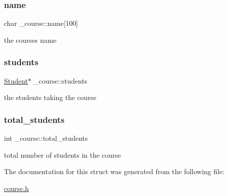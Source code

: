 \subsubsection{\texorpdfstring{name}{name}}
{\footnotesize\ttfamily char \+\_\+course\+::name\mbox{[}100\mbox{]}}

the course\textquotesingle{}s name \mbox{\label{struct__course_a5cf448bc80f0f8c5f23402db23d41a00}} 
\subsubsection{\texorpdfstring{students}{students}}
{\footnotesize\ttfamily \mbox{\hyperlink{student_8h_abcfb362c0eb3182c835992cf3d0c0dd3}{Student}}$\ast$ \+\_\+course\+::students}

the student\textquotesingle{}s taking the course \mbox{\label{struct__course_afd5e161f7cf358c13cc8aa868b462006}} 
\subsubsection{\texorpdfstring{total\+\_\+students}{total\_students}}
{\footnotesize\ttfamily int \+\_\+course\+::total\+\_\+students}

total number of students in the course 

The documentation for this struct was generated from the following file\+:\begin{DoxyCompactItemize}
\item 
\mbox{\hyperlink{course_8h}{course.\+h}}\end{DoxyCompactItemize}
